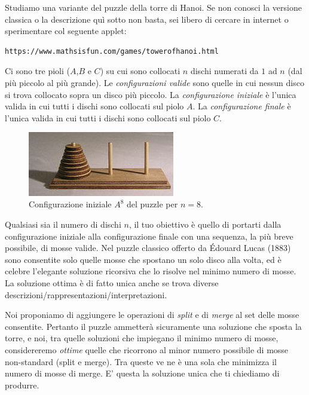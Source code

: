 \renewcommand{\nomebreve}{hanoi\_with\_split\_merge}
\renewcommand{\titolo}{Move an Hanoi tower with split and merge moves allowed\\}

\introduzione{}

Studiamo una variante del puzzle della torre di Hanoi. Se non conosci la versione classica o la descrizione quì sotto non basta, sei libero di cercare in internet o sperimentare col seguente applet:

\begin{verbatim}
https://www.mathsisfun.com/games/towerofhanoi.html
\end{verbatim}

Ci sono tre pioli ($A$,$B$ e $C$) su cui sono collocati $n$ dischi numerati da $1$ ad $n$ (dal più piccolo al più grande). Le \emph{configurazioni valide} sono quelle in cui nessun disco si trova collocato sopra un disco più piccolo.
La \emph{configurazione iniziale} è l'unica valida in cui tutti i dischi sono collocati sul piolo $A$. La \emph{configurazione finale} è l'unica valida in cui tutti i dischi sono collocati sul piolo $C$.

\begin{figure}[h!]
\begin{center}
  \noindent \includegraphics[width=0.57\textwidth]{figures/220px-Tower_of_Hanoi.jpeg}
\end{center}
\caption{Configurazione iniziale $A^8$ del puzzle per $n=8$.}
\end{figure}

Qualsiasi sia il numero di dischi $n$, il tuo obiettivo è quello di portarti dalla configurazione iniziale alla configurazione finale con una sequenza, la più breve possibile, di mosse valide.
Nel puzzle classico offerto da Édouard Lucas (1883) sono consentite solo quelle mosse che spostano un solo disco alla volta, ed è celebre l'elegante soluzione ricorsiva che lo risolve nel minimo numero di mosse. La soluzione ottima è di fatto unica anche se trova diverse descrizioni/rappresentazioni/interpretazioni.

Noi proponiamo di aggiungere le operazioni di \emph{split} e di \emph{merge} al set delle mosse consentite. Pertanto il puzzle ammetterà sicuramente una soluzione che sposta la torre, e noi, tra quelle soluzioni che impiegano il minimo numero di mosse, considereremo \emph{ottime} quelle che ricorrono al minor numero possibile di mosse non-standard (split e merge). Tra queste ve ne è una sola che minimizza il numero di mosse di merge. E' questa la soluzione unica che ti chiediamo di produrre.\\

